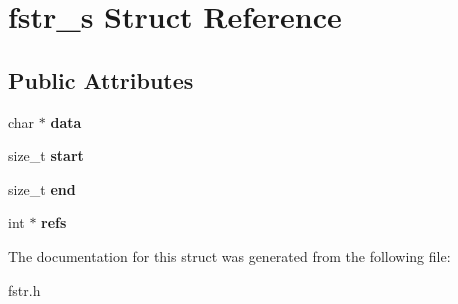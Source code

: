 \hypertarget{structfstr__s}{}\section{fstr\+\_\+s Struct Reference}
\label{structfstr__s}
\subsection*{Public Attributes}
\begin{DoxyCompactItemize}
\item 
char $\ast$ {\bfseries data}\hypertarget{structfstr__s_adc44dd3a33ce7b32d9b9a85f1a0c2d50}{}\label{structfstr__s_adc44dd3a33ce7b32d9b9a85f1a0c2d50}

\item 
size\+\_\+t {\bfseries start}\hypertarget{structfstr__s_a52c8d6feff8a8245b6eae1c21f6d125e}{}\label{structfstr__s_a52c8d6feff8a8245b6eae1c21f6d125e}

\item 
size\+\_\+t {\bfseries end}\hypertarget{structfstr__s_a5da96a1a85832106ab8fa7a97772ce8b}{}\label{structfstr__s_a5da96a1a85832106ab8fa7a97772ce8b}

\item 
int $\ast$ {\bfseries refs}\hypertarget{structfstr__s_ad22b636b6bfc40a1348ee2fab0110405}{}\label{structfstr__s_ad22b636b6bfc40a1348ee2fab0110405}

\end{DoxyCompactItemize}


The documentation for this struct was generated from the following file\+:\begin{DoxyCompactItemize}
\item 
fstr.\+h\end{DoxyCompactItemize}
